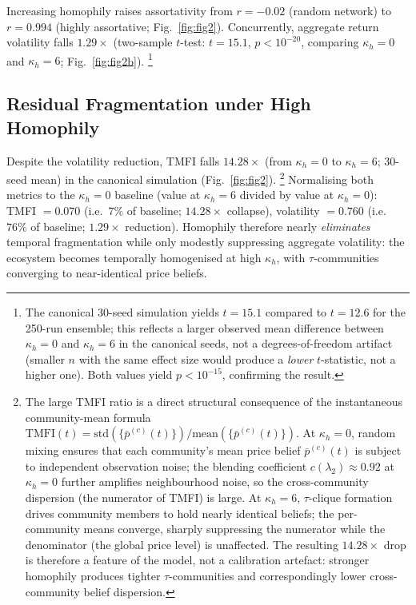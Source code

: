\documentclass[10pt,twocolumn]{article}
\begin{document}
Increasing homophily raises assortativity from $r = -0.02$ (random network)
to $r = 0.994$ (highly assortative; Fig.~\ref{fig:fig2}).  Concurrently, aggregate return
volatility falls $1.29\times$ (two-sample $t$-test: $t = 15.1$,
$p < 10^{-20}$, comparing $\kappa_h = 0$ and $\kappa_h = 6$; Fig.~\ref{fig:fig2b}).%
\footnote{The canonical 30-seed simulation yields $t = 15.1$ compared to
$t = 12.6$ for the 250-run ensemble; this reflects a larger observed mean
difference between $\kappa_h = 0$ and $\kappa_h = 6$ in the canonical seeds,
not a degrees-of-freedom artifact (smaller $n$ with the same effect size
would produce a \emph{lower} $t$-statistic, not a higher one).
Both values yield $p < 10^{-15}$, confirming the result.}

\subsection{Residual Fragmentation under High Homophily}

Despite the volatility reduction, TMFI falls $14.28\times$ (from $\kappa_h = 0$ to
$\kappa_h = 6$; 30-seed mean) in the canonical simulation (Fig.~\ref{fig:fig2}).%
\footnote{The large TMFI ratio is a direct structural consequence of the instantaneous community-mean formula $\mathrm{TMFI}(t) = \mathrm{std}(\{\bar{p}^{(c)}(t)\}) / \mathrm{mean}(\{\bar{p}^{(c)}(t)\})$.
At $\kappa_h = 0$, random mixing ensures that each community's mean price belief $\bar{p}^{(c)}(t)$ is subject to independent observation noise; the blending coefficient $c(\lambda_2) \approx 0.92$ at $\kappa_h = 0$ further amplifies neighbourhood noise, so the cross-community dispersion (the numerator of TMFI) is large.
At $\kappa_h = 6$, $\tau$-clique formation drives community members to hold nearly identical beliefs; the per-community means converge, sharply suppressing the numerator while the denominator (the global price level) is unaffected.
The resulting $14.28\times$ drop is therefore a feature of the model, not a calibration artefact: stronger homophily produces tighter $\tau$-communities and correspondingly lower cross-community belief dispersion.}
Normalising both metrics to the $\kappa_h=0$ baseline (value at
$\kappa_h=6$ divided by value at $\kappa_h=0$): TMFI $= 0.070$
(i.e.\ $7\%$ of baseline; $14.28\times$ collapse), volatility $= 0.760$
(i.e.\ $76\%$ of baseline; $1.29\times$ reduction).
Homophily therefore nearly \emph{eliminates} temporal fragmentation while
only modestly suppressing aggregate volatility: the ecosystem becomes
temporally homogenised at high $\kappa_h$, with $\tau$-communities
converging to near-identical price beliefs.
\end{document}
